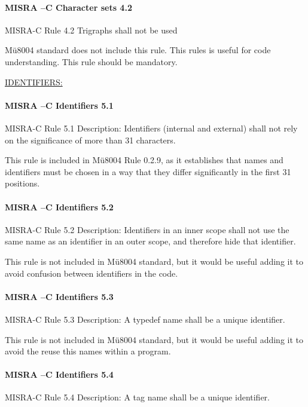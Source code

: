 \paragraph{MISRA –C Character sets 4.2}
MISRA-C Rule 4.2 Trigraphs shall not be used


Mü8004 standard does not include this rule. This rules is useful for code understanding. This rule should be mandatory.


\begin{center}
\textsc{\underline{IDENTIFIERS:}}
\end{center}

\paragraph{MISRA –C Identifiers 5.1}
MISRA-C Rule 5.1 Description: Identifiers (internal and external) shall not rely on the significance of more than 31 characters.

This rule is included in Mü8004 Rule 0.2.9, as it establishes that names and identifiers must be chosen in a way that they differ significantly in the first 31 positions.

\paragraph{MISRA –C Identifiers 5.2}
MISRA-C Rule 5.2 Description: Identifiers in an inner scope shall not use the same name as an identifier in an outer scope, and therefore hide that identifier.

This rule is not included in Mü8004 standard, but it would be useful adding it to avoid confusion between identifiers in the code.


\paragraph{MISRA –C Identifiers 5.3}
MISRA-C Rule 5.3 Description: A typedef name shall be a unique identifier.

This rule is not included in Mü8004 standard, but it would be useful adding it to avoid the reuse this names within a program.


\paragraph{MISRA –C Identifiers 5.4}
MISRA-C Rule 5.4 Description: A tag name shall be a unique identifier.

